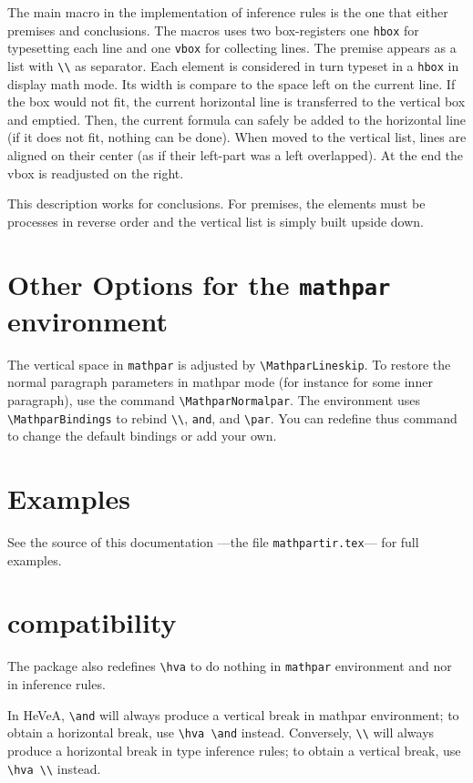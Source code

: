 \documentclass {article}
\let \lst \verb
\begin{document}
The main macro in the implementation of inference rules is the one that
either premises and conclusions.  The macros uses two box-registers one
\verb"hbox" for typesetting each line and one \verb"vbox" for collecting
lines. The premise appears as a list with
\verb"\\" as separator. Each element is considered in turn typeset in a
\verb"hbox" in display math mode. Its width is compare to the space left on
the current line. If the box would not fit, the current horizontal line is
transferred to the vertical box and emptied. Then, the current formula can
safely be added to the horizontal line (if it does not fit, nothing can be
done). When moved to the vertical list, lines are aligned on their center
(as if their left-part was a left overlapped). At the end the vbox is
readjusted on the right. 

This description works for conclusions. For premises, the elements must be
processes in reverse order and the vertical list is simply built upside
down. 

\section {Other Options for the {\tt mathpar} environment}

The vertical space in \verb"mathpar" is adjusted by
\verb"\MathparLineskip". To restore the normal paragraph parameters in mathpar
mode (for instance for some inner paragraph), use the command
\verb"\MathparNormalpar".  
The environment uses \verb"\MathparBindings" to
rebind \verb"\\", \verb"and", and \verb"\par". You can redefine thus command
to change the default bindings or add your own. 


\section {Examples}

See the source of this documentation ---the file \lst"mathpartir.tex"---
for full examples. 

\section {{\hevea} compatibility}

The package also redefines \verb"\hva" to do nothing in \lst"mathpar"
environment and nor in inference rules. 

In HeVeA, \verb"\and" will always produce a vertical break in mathpar
environment; to obtain a horizontal break, use \verb"\hva \and" instead.
Conversely, \verb"\\" will always produce a horizontal break in type
inference rules; to obtain a vertical break, use \verb"\hva \\" instead.
\end{document}
